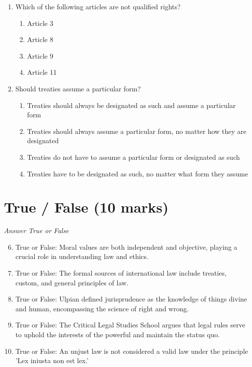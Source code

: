 \documentclass[12pt]{article}
\begin{document}
\begin{enumerate}[label=\arabic*.]
\begin{enumerate}[label=(\alph*)]
\end{enumerate}
\item Which of the following articles are not qualified rights?
\begin{enumerate}[label=(\alph*)]
    \item Article 3
    \item Article 8
    \item Article 9
    \item Article 11
\end{enumerate}
\item Should treaties assume a particular form?
\begin{enumerate}[label=(\alph*)]
    \item Treaties should always be designated as such and assume a particular form
    \item Treaties should always assume a particular form, no matter how they are designated
    \item Treaties do not have to assume a particular form or designated as such
    \item Treaties have to be designated as such, no matter what form they assume
\end{enumerate}
\end{enumerate}

\section*{True / False (10 marks)}
\textit{Answer True or False}
\begin{enumerate}[label=\arabic*.]
\setcounter{enumi}{5}
\item True or False: Moral values are both independent and objective, playing a crucial role in understanding law and ethics.
\item True or False: The formal sources of international law include treaties, custom, and general principles of law.
\item True or False: Ulpian defined jurisprudence as the knowledge of things divine and human, encompassing the science of right and wrong.
\item True or False: The Critical Legal Studies School argues that legal rules serve to uphold the interests of the powerful and maintain the status quo.
\item True or False: An unjust law is not considered a valid law under the principle 'Lex iniusta non est lex.'
\end{enumerate}
\end{document}
